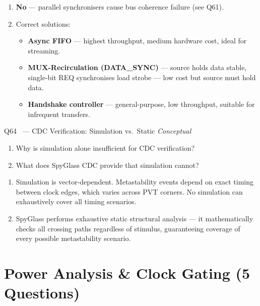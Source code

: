 \documentclass[12pt,a4paper]{article}
\newcommand{\moderate}{%
  \fbox{\textcolor{modoran}{\bfseries\sffamily\small MODERATE}}}
\begin{document}
\begin{answerbox}
\begin{enumerate}[label=\textbf{\alph*)}]
  \item \textbf{No} --- parallel synchronisers cause bus coherence failure (see Q61).
  \item Correct solutions:
    \begin{itemize}
      \item \textbf{Async FIFO} --- highest throughput, medium hardware cost, ideal for streaming.
      \item \textbf{MUX-Recirculation (DATA\_SYNC)} --- source holds data stable, single-bit REQ synchronises load strobe --- low cost but source must hold data.
      \item \textbf{Handshake controller} --- general-purpose, low throughput, suitable for infrequent transfers.
    \end{itemize}
\end{enumerate}
\end{answerbox}

\begin{questionbox}{Q64 \moderate\ --- CDC Verification: Simulation vs.\ Static \hfill\textit{Conceptual}}
\begin{enumerate}[label=\textbf{\alph*)}]
  \item Why is simulation alone insufficient for CDC verification?
  \item What does SpyGlass CDC provide that simulation cannot?
\end{enumerate}
\end{questionbox}

\begin{answerbox}
\begin{enumerate}[label=\textbf{\alph*)}]
  \item Simulation is vector-dependent. Metastability events depend on exact timing between clock edges, which varies across PVT corners. No simulation can exhaustively cover all timing scenarios.
  \item SpyGlass performs exhaustive static structural analysis --- it mathematically checks all crossing paths regardless of stimulus, guaranteeing coverage of every possible metastability scenario.
\end{enumerate}
\end{answerbox}

\section{Power Analysis \& Clock Gating (5 Questions)}
\label{sec:power}
\end{document}
